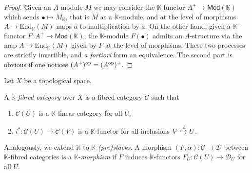 \begin{proof}
	Given an $A$-module $M$ we may consider the $\mathbb{K}$-functor $A^{+} \to \mathsf{Mod}(\mathbb{K})$ which sends $\bullet \mapsto M_{\mathbb{K}}$, that is $M$ as a $\mathbb{K}$-module, and at the level of morphisms $A \to \mathrm{End}_{\mathbb{K}}(M)$ maps $a$ to multiplication by $a$. On the other hand, given a $\mathbb{K}$-functor $F\colon A^{+} \to \mathsf{Mod}(\mathbb{K})$, the $\mathbb{K}$-module $F(\bullet)$ admits an $A$-structure via the map $A \to \mathrm{End}_{\mathbb{K}}(M)$ given by $F$ at the level of morphisms. These two processes are strictly invertible, and \textit{a fortiori} form an equivalence. The second part is obvious if one notices $(A^{+})^{{ \mathrm{op} }} = (A^{{ \mathrm{op} }})^{+}.$
\end{proof}

Let $X$ be a topological space. 
\begin{definition}\label{def:linear-stack}
	A $\mathbb{K}$-\textit{fibred category} over $X$ is a fibred category $\mathcal{C}$ such that
	\begin{enumerate}[label = (\roman*)]
		\item $\mathcal{C}(U)$ is a $\mathbb{K}$-linear category for all $U$;
		\item $i^{*}\colon \mathcal{C}(U) \to \mathcal{C}(V)$ is a $\mathbb{K}$-functor for all inclusions $V \xhookrightarrow{i} U$.
	\end{enumerate}
	Analogously, we extend it to $\mathbb{K}$-\textit{(pre)stacks.} A morphism $(F,\alpha)\colon \mathcal{C} \to \mathcal{D}$ between $\mathbb{K}$-fibred categories is a $\mathbb{K}$-\textit{morphism} if $F$ induces $\mathbb{K}$-functors $F_{U}\colon \mathcal{C}(U) \to \mathcal{D}_{U}$ for all $U$.
\end{definition}
